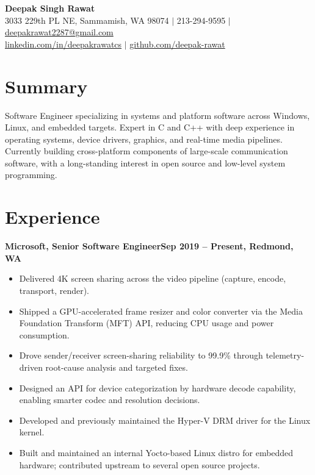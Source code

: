 \documentclass[11pt]{article}
\newcommand{\jobentry}[2]{%
  \noindent\textbf{#1}\hfill\textbf{#2}\par\vspace{-6pt}}
\begin{document}
\raggedright

\begin{center}
    {\LARGE \textbf{Deepak Singh Rawat}} \\[2pt]
    3033 229th PL NE, Sammamish, WA 98074 $|$ 213-294-9595 $|$
    \href{mailto:deepakrawat2287@gmail.com}{deepakrawat2287@gmail.com} \\
    \href{https://www.linkedin.com/in/deepakrawatcs}{linkedin.com/in/deepakrawatcs} $|$
    \href{https://github.com/deepak-rawat}{github.com/deepak-rawat}
\end{center}

\section*{Summary}
Software Engineer specializing in systems and platform software across Windows, Linux, and embedded targets. Expert in C and C++ with deep experience in operating systems, device drivers, graphics, and real-time media pipelines. Currently building cross-platform components of large-scale communication software, with a long-standing interest in open source and low-level system programming.

\section*{Experience}

\jobentry{Microsoft, Senior Software Engineer}{Sep 2019 -- Present, Redmond, WA}
\begin{itemize}
    \item Delivered 4K screen sharing across the video pipeline (capture, encode, transport, render).
    \item Shipped a GPU-accelerated frame resizer and color converter via the Media Foundation Transform (MFT) API, reducing CPU usage and power consumption.
    \item Drove sender/receiver screen-sharing reliability to 99.9\% through telemetry-driven root-cause analysis and targeted fixes.
    \item Designed an API for device categorization by hardware decode capability, enabling smarter codec and resolution decisions.
    \item Developed and previously maintained the Hyper-V DRM driver for the Linux kernel.
    \item Built and maintained an internal Yocto-based Linux distro for embedded hardware; contributed upstream to several open source projects.
\end{itemize}
\end{document}
